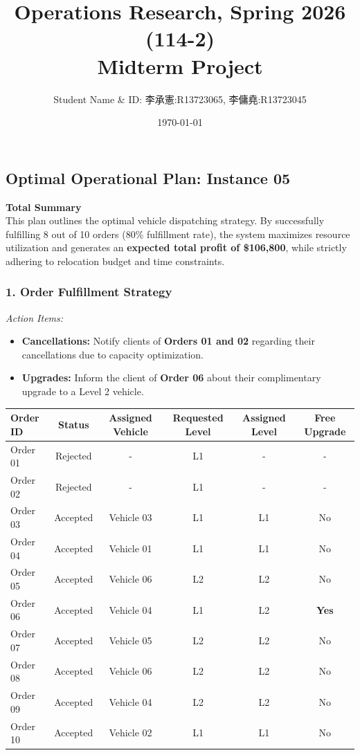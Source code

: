\documentclass[12pt, a4paper]{article}
\title{Operations Research, Spring 2026 (114-2) \\ Midterm Project}
\author{Student Name \& ID: 李承憲:R13723065, 李傭堯:R13723045}
\date{\today}
\begin{document}

\subsection*{Optimal Operational Plan: Instance 05}

\textbf{Total Summary} \\
This plan outlines the optimal vehicle dispatching strategy. By successfully fulfilling 8 out of 10 orders (80\% fulfillment rate), the system maximizes resource utilization and generates an \textbf{expected total profit of \$106,800}, while strictly adhering to relocation budget and time constraints.

\vspace{1em}

\subsubsection*{1. Order Fulfillment Strategy}
\textit{Action Items:} 
\begin{itemize}
    \vspace{-0.5em}
    \setlength{\itemsep}{0pt}
    \item \textbf{Cancellations:} Notify clients of \textbf{Orders 01 and 02} regarding their cancellations due to capacity optimization.
    \item \textbf{Upgrades:} Inform the client of \textbf{Order 06} about their complimentary upgrade to a Level 2 vehicle.
\end{itemize}

\begin{table}[H]
    \centering
    \small
    \begin{tabular}{l c c c c c}
        \toprule
        \textbf{Order ID} & \textbf{Status} & \textbf{Assigned Vehicle} & \textbf{Requested Level} & \textbf{Assigned Level} & \textbf{Free Upgrade} \\
        \midrule
        Order 01 & Rejected & -          & L1 & -  & - \\
        Order 02 & Rejected & -          & L1 & -  & - \\
        Order 03 & Accepted & Vehicle 03 & L1 & L1 & No \\
        Order 04 & Accepted & Vehicle 01 & L1 & L1 & No \\
        Order 05 & Accepted & Vehicle 06 & L2 & L2 & No \\
        Order 06 & Accepted & Vehicle 04 & L1 & L2 & \textbf{Yes} \\
        Order 07 & Accepted & Vehicle 05 & L2 & L2 & No \\
        Order 08 & Accepted & Vehicle 06 & L2 & L2 & No \\
        Order 09 & Accepted & Vehicle 04 & L2 & L2 & No \\
        Order 10 & Accepted & Vehicle 02 & L1 & L1 & No \\
        \bottomrule
    \end{tabular}
\end{table}
\end{document}

